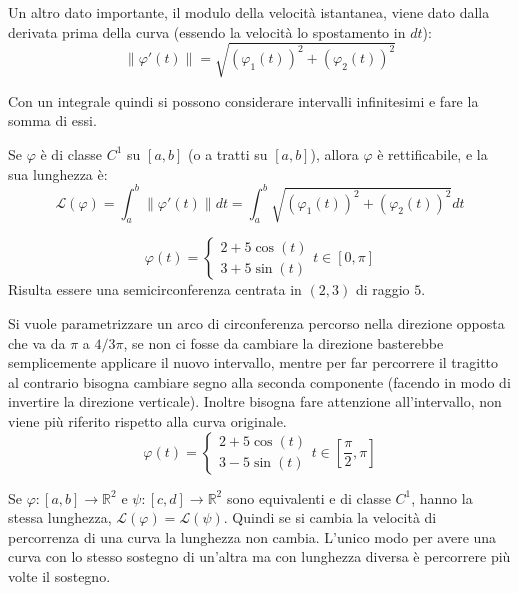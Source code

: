 Un altro dato importante, il modulo della velocità istantanea, viene dato dalla derivata prima della curva (essendo la velocità lo spostamento in $dt$):
\begin{equation}
	\left\|\varphi'(t)\right\|=\sqrt{(\varphi_1(t))^2+(\varphi_2(t))^2}
\end{equation}

Con un integrale quindi si possono considerare intervalli infinitesimi e fare la somma di essi.

\begin{theorem}
Se $\varphi$ è di classe $C^1$ su $[a, b]$ (o a tratti su $[a, b]$), allora $\varphi$ è rettificabile, e la sua lunghezza è:
\begin{equation}
	\mathcal{L}(\varphi)=\int_{a}^{b}\|\varphi'(t)\|dt=\int_{a}^{b} \sqrt{(\varphi_1(t))^2+(\varphi_2(t))^2}dt
\end{equation}
\end{theorem}

\begin{example}
\[
	\varphi(t)=\begin{cases}
		2+5\cos(t) \\
		3+5\sin(t)
	\end{cases}	t\in [0, \pi]
\]
Risulta essere una semicirconferenza centrata in $(2, 3)$ di raggio $5$.

Si vuole parametrizzare un arco di circonferenza percorso nella direzione opposta che va da $\pi$ a $4/3\pi$, se non ci fosse da cambiare la direzione basterebbe semplicemente applicare il nuovo intervallo, mentre per far percorrere il tragitto al contrario bisogna cambiare segno alla seconda componente (facendo in modo di invertire la direzione verticale). Inoltre bisogna fare attenzione all'intervallo, non viene più riferito rispetto alla curva originale.
\[
	\varphi(t)=\begin{cases}
		2+5\cos(t) \\
		3-5\sin(t)
	\end{cases}	t\in [\frac{\pi}{2}, \pi]
\]


\end{example}

\begin{theorem}
Se $\varphi : [a, b]\rightarrow \mathbb{R}^2$ e $\psi : [c, d]\rightarrow \mathbb{R}^2$ sono equivalenti e di classe $C^1$, hanno la stessa lunghezza, $\mathcal{L}(\varphi)=\mathcal{L}(\psi)$. Quindi se si cambia la velocità di percorrenza di una curva la lunghezza non cambia. L'unico modo per avere una curva con lo stesso sostegno di un'altra ma con lunghezza diversa è percorrere più volte il sostegno.
\end{theorem}

